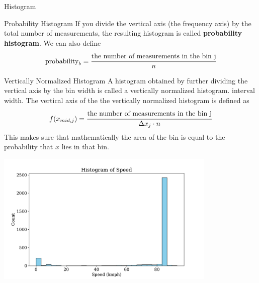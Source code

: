 \documentclass[aspectratio=169,xcolor=dvipsnames,svgnames,x11names,fleqn]{beamer}
\begin{document}
\begin{frame}{Histogram}
\begin{facts}{Probability Histogram}
    If you divide the vertical axis (the frequency axis) by the total number of measurements, the resulting histogram is called \textbf{probability histogram}. We can also define 
    \begin{equation}
        \text{probability}_b = \cfrac{\text{the number of measurements in the bin j}}{n}
    \end{equation}
\end{facts}
\begin{gradbox}{Vertically Normalized Histogram}
    A histogram obtained by further dividing the
vertical axis by the bin width is called a vertically normalized histogram.
interval width. The vertical axis of the
the vertically normalized histogram is defined as
\begin{equation}
    f(x_{mid,j} ) =  \cfrac{\text{the number of measurements in the bin j}}{\Delta x_j \cdot n}
\end{equation}
 This makes sure that mathematically the area of the bin is equal to the probability that $x$ lies in that bin. 
\end{gradbox}

    \includegraphics[width=0.79\textwidth]{figures/histogram.pdf}


\end{frame}
\end{document}
